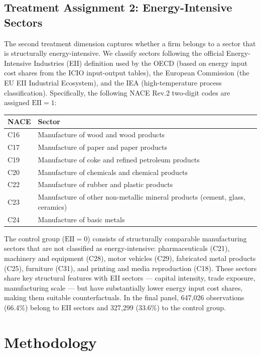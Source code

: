 \documentclass[authoryear,preprint,review,12pt]{elsarticle}
\begin{document}
\subsection{Treatment Assignment 2: Energy-Intensive Sectors}

The second treatment dimension captures whether a firm belongs to a sector that is structurally energy-intensive. We classify sectors following the official Energy-Intensive Industries (EII) definition used by the OECD (based on energy input cost shares from the ICIO input-output tables), the European Commission (the EU EII Industrial Ecosystem), and the IEA (high-temperature process classification). Specifically, the following NACE Rev.2 two-digit codes are assigned $\text{EII}=1$:

\begin{center}
\small
\begin{tabular}{ll}
\toprule
NACE & Sector \\
\midrule
C16 & Manufacture of wood and wood products \\
C17 & Manufacture of paper and paper products \\
C19 & Manufacture of coke and refined petroleum products \\
C20 & Manufacture of chemicals and chemical products \\
C22 & Manufacture of rubber and plastic products \\
C23 & Manufacture of other non-metallic mineral products (cement, glass, ceramics) \\
C24 & Manufacture of basic metals \\
\bottomrule
\end{tabular}
\end{center}

The control group ($\text{EII}=0$) consists of structurally comparable manufacturing sectors that are not classified as energy-intensive: pharmaceuticals (C21), machinery and equipment (C28), motor vehicles (C29), fabricated metal products (C25), furniture (C31), and printing and media reproduction (C18). These sectors share key structural features with EII sectors --- capital intensity, trade exposure, manufacturing scale --- but have substantially lower energy input cost shares, making them suitable counterfactuals. In the final panel, 647,026 observations (66.4\%) belong to EII sectors and 327,299 (33.6\%) to the control group.

\section{Methodology}
\label{sec:method}
\end{document}
